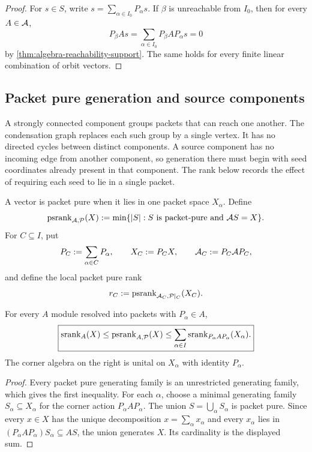 \begin{proof}
For $s\in S$, write $s=\sum_{\alpha\in I_0}P_\alpha s$.  If $\beta$ is unreachable from $I_0$, then for every $A\in\mathcal A$,
\[
P_\beta As
=
\sum_{\alpha\in I_0}P_\beta AP_\alpha s
=0
\]
by \cref{thm:algebra-reachability-support}.  The same holds for every finite linear combination of orbit vectors.
\end{proof}

\subsection{Packet pure generation and source components}
A strongly connected component groups packets that can reach one another.  The condensation graph replaces each such group by a single vertex.  It has no directed cycles between distinct components.  A source component has no incoming edge from another component, so generation there must begin with seed coordinates already present in that component.  The rank below records the effect of requiring each seed to lie in a single packet.

\begin{definition}
\label{def:directed-seed-rank}
A vector is packet pure when it lies in one packet space $X_\alpha$.  Define
\[
\operatorname{psrank}_{\mathcal A,\mathcal P}(X)
:=
\min\{|S|:S\text{ is packet-pure and }\mathcal A S=X\}.
\]
For $C\subseteq I$, put
\[
P_C:=\sum_{\alpha\in C}P_\alpha,
\qquad
X_C:=P_CX,
\qquad
\mathcal A_C:=P_C\mathcal A P_C,
\]
and define the local packet pure rank
\[
r_C:=\operatorname{psrank}_{\mathcal A_C,\mathcal P|_C}(X_C).
\]
\end{definition}

\begin{proposition}
\label{prop:packet-pure-rank-bounds}
For every $A$ module resolved into packets with $P_\alpha\in A$,
\[
\boxed{
\operatorname{srank}_A(X)
\leq
\operatorname{psrank}_{A,\mathcal P}(X)
\leq
\sum_{\alpha\in I}
\operatorname{srank}_{P_\alpha A P_\alpha}(X_\alpha).
}
\]
The corner algebra on the right is unital on $X_\alpha$ with identity $P_\alpha$.
\end{proposition}

\begin{proof}
Every packet pure generating family is an unrestricted generating family, which gives the first inequality.  For each $\alpha$, choose a minimal generating family $S_\alpha\subseteq X_\alpha$ for the corner action $P_\alpha A P_\alpha$.  The union $S=\bigcup_\alpha S_\alpha$ is packet pure.  Since every $x\in X$ has the unique decomposition $x=\sum_\alpha x_\alpha$ and every $x_\alpha$ lies in $(P_\alpha A P_\alpha)S_\alpha\subseteq AS$, the union generates $X$.  Its cardinality is the displayed sum.
\end{proof}

